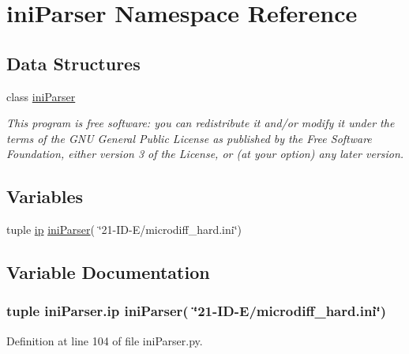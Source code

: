 \hypertarget{namespaceiniParser}{\section{ini\-Parser Namespace Reference}
\label{namespaceiniParser}
}
\subsection*{Data Structures}
\begin{DoxyCompactItemize}
\item 
class \hyperlink{classiniParser_1_1iniParser}{ini\-Parser}
\begin{DoxyCompactList}\small\item\em This program is free software\-: you can redistribute it and/or modify it under the terms of the G\-N\-U General Public License as published by the Free Software Foundation, either version 3 of the License, or (at your option) any later version. \end{DoxyCompactList}\end{DoxyCompactItemize}
\subsection*{Variables}
\begin{DoxyCompactItemize}
\item 
tuple \hyperlink{namespaceiniParser_ac1ed4e851042909f1667bbf67fb9b8d7}{ip} \hyperlink{classiniParser_1_1iniParser}{ini\-Parser}( \char`\"{}21-\/I\-D-\/E/microdiff\-\_\-hard.\-ini\char`\"{})
\end{DoxyCompactItemize}


\subsection{Variable Documentation}
\hypertarget{namespaceiniParser_ac1ed4e851042909f1667bbf67fb9b8d7}{
\subsubsection[{ip}]{\setlength{\rightskip}{0pt plus 5cm}tuple ini\-Parser.\-ip {\bf ini\-Parser}( \char`\"{}21-\/I\-D-\/E/microdiff\-\_\-hard.\-ini\char`\"{})}}\label{namespaceiniParser_ac1ed4e851042909f1667bbf67fb9b8d7}


Definition at line 104 of file ini\-Parser.\-py.

